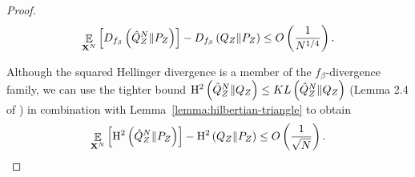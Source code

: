 \begin{proof}
\begin{align*}
    \mathop{\mathbb{E}}_{\mathbf{X}^N}\left[D_{f_\beta}\left( \hat{Q}^N_Z \| P_Z\right)\right] - D_{f_\beta}\left( Q_{Z} \| P_Z\right) \leq O\left(\frac{1}{N^{1/4}}\right).
\end{align*}

Although the squared Hellinger divergence is a member of the $f_\beta$-divergence family, we can use the tighter bound $\mathrm{H}^2\left( \hat{Q}^N_Z \| Q_Z\right) \leq KL\left( \hat{Q}^N_Z \| Q_Z\right)$ (Lemma 2.4 of \cite{tsybakov2009}) in combination with Lemma~\ref{lemma:hilbertian-triangle} to obtain
\begin{align*}
    \mathop{\mathbb{E}}_{\mathbf{X}^N}\left[\mathrm{H}^2\left( \hat{Q}^N_Z \| P_Z\right)\right] - \mathrm{H}^2\left( Q_{Z} \| P_Z\right) \leq O\left(\frac{1}{\sqrt{N}}\right).
\end{align*}
\end{proof}
